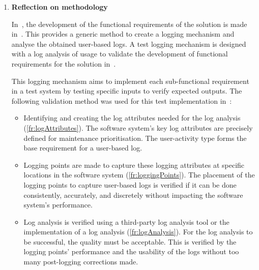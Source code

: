 \begin{enumerate}[label=\textbf{\Roman*.}]
	For objective E2, the results of implementing the method in the test system are verified in this objective. Objectives L1, L2, L3, and L4 verified if the technique could create software maintenance prioritisations for the test system by comparing it to the expected results. \par For objective E3, the verified method of E1 is applied to multiple case studies and the results are evaluated. A critical analysis of the case studies is performed to validate the software maintenance prioritisation for this study, utilising the case studies' results. With this validation strategy, it is validated that this study meets the study objectives with the created solution for the original problem statement.

\item \textbf{Reflection on methodology} \par In~, the development of the functional requirements of the solution is made in~. This provides a generic method to create a logging mechanism and analyse the obtained user-based logs. A test logging mechanism is designed with a log analysis of usage to validate the development of functional requirements for the solution in~. \par This logging mechanism aims to implement each sub-functional requirement in a test system by testing specific inputs to verify expected outputs. The following validation method was used for this test implementation in~:
	\begin{itemize}
		\item Identifying and creating the log attributes needed for the log analysis (\ref{fr:logAttributes}). The software system's key log attributes are precisely defined for maintenance prioritisation. The user-activity type forms the base requirement for a user-based log.
		
		\item Logging points are made to capture these logging attributes at specific locations in the software system (\ref{fr:loggingPoints}). The placement of the logging points to capture user-based logs is verified if it can be done consistently, accurately, and discretely without impacting the software system's performance. 
		
		\item Log analysis is verified using a third-party log analysis tool or the implementation of a log analysis (\ref{fr:logAnalysis}). For the log analysis to be successful, the quality must be acceptable. This is verified by the logging points' performance and the usability of the logs without too many post-logging corrections made.
		

\end{itemize}
\end{enumerate}
